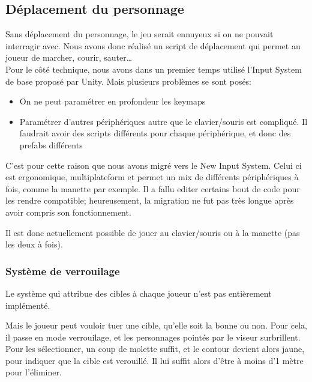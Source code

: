 \documentclass[french, 12pt]{article}
\begin{document}
        \subsection{Déplacement du personnage}
        
            Sans déplacement du personnage, le jeu serait ennuyeux si on ne pouvait interragir avec.
            Nous avons donc réalisé un script de déplacement qui permet au joueur de marcher, courir, sauter\dots\\

            Pour le côté technique, nous avons dans un premier temps utilisé l'Input System de base proposé par Unity. Mais plusieurs problèmes se sont posés:
            \begin{itemize}
                \item On ne peut paramétrer en profondeur les keymaps
                \item Paramétrer d'autres périphériques autre que le clavier/souris est compliqué. Il faudrait avoir des scripts différents pour chaque périphérique, et donc des prefabs différents
            \end{itemize}
            C'est pour cette raison que nous avons migré vers le New Input System.
            Celui ci est ergonomique, multiplateform et permet un mix de différents périphériques à fois, comme la manette par exemple.
            Il a fallu editer certains bout de code pour les rendre compatible; heureusement, la migration ne fut pas très longue après avoir compris son fonctionnement.

            Il est donc actuellement possible de jouer au clavier/souris ou à la manette (pas les deux à fois).
        
        \subsubsection{Système de verrouilage}

            Le système qui attribue des cibles à chaque joueur n'est pas entièrement implémenté.
            
            Mais le joueur peut vouloir tuer une cible, qu'elle soit la bonne ou non.
            Pour cela, il passe en mode verrouilage, et les personnages pointés par le viseur surbrillent.
            Pour les sélectionner, un coup de molette suffit, et le contour devient alors jaune, pour indiquer que la cible est verouillé.
            Il lui suffit alors d'être à moins d'1 mètre pour l'éliminer.
\end{document}
